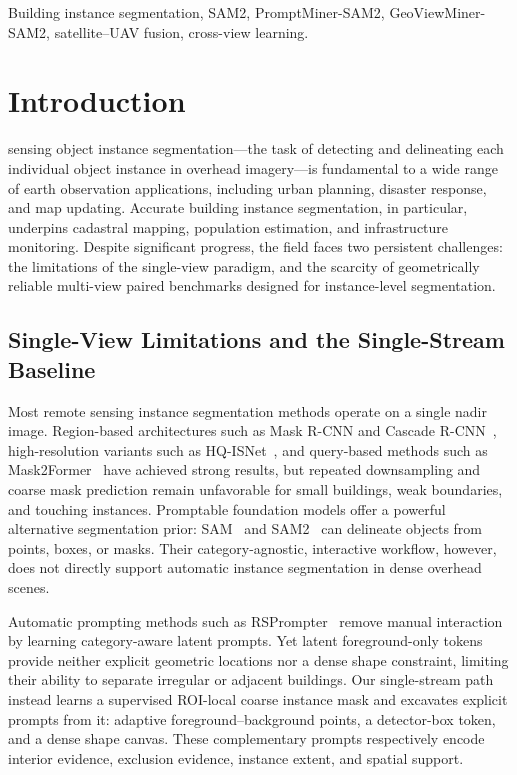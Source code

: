 \documentclass[letterpaper,journal]{IEEEtran}
\begin{document}
\begingroup
{}
\begin{IEEEkeywords}
Building instance segmentation, SAM2, PromptMiner-SAM2, GeoViewMiner-SAM2, satellite--UAV fusion, cross-view learning.
\end{IEEEkeywords}
\endgroup


\section{Introduction}
 sensing object instance segmentation---the task of detecting and delineating each individual object instance in overhead imagery---is fundamental to a wide range of earth observation applications, including urban planning, disaster response, and map updating. Accurate building instance segmentation, in particular, underpins cadastral mapping, population estimation, and infrastructure monitoring. Despite significant progress, the field faces two persistent challenges: the limitations of the single-view paradigm, and the scarcity of geometrically reliable multi-view paired benchmarks designed for instance-level segmentation.

\subsection{Single-View Limitations and the Single-Stream Baseline}

Most remote sensing instance segmentation methods operate on a single nadir image. Region-based architectures such as Mask R-CNN and Cascade R-CNN~\cite{ref_maskrcnn,ref_cascade}, high-resolution variants such as HQ-ISNet~\cite{ref_hqisnet}, and query-based methods such as Mask2Former~\cite{ref_mask2former} have achieved strong results, but repeated downsampling and coarse mask prediction remain unfavorable for small buildings, weak boundaries, and touching instances. Promptable foundation models offer a powerful alternative segmentation prior: SAM~\cite{ref_sam} and SAM2~\cite{ref_sam2} can delineate objects from points, boxes, or masks. Their category-agnostic, interactive workflow, however, does not directly support automatic instance segmentation in dense overhead scenes.

Automatic prompting methods such as RSPrompter~\cite{ref_rsprompter} remove manual interaction by learning category-aware latent prompts. Yet latent foreground-only tokens provide neither explicit geometric locations nor a dense shape constraint, limiting their ability to separate irregular or adjacent buildings. Our single-stream path instead learns a supervised ROI-local coarse instance mask and excavates explicit prompts from it: adaptive foreground--background points, a detector-box token, and a dense shape canvas. These complementary prompts respectively encode interior evidence, exclusion evidence, instance extent, and spatial support.
\end{document}
